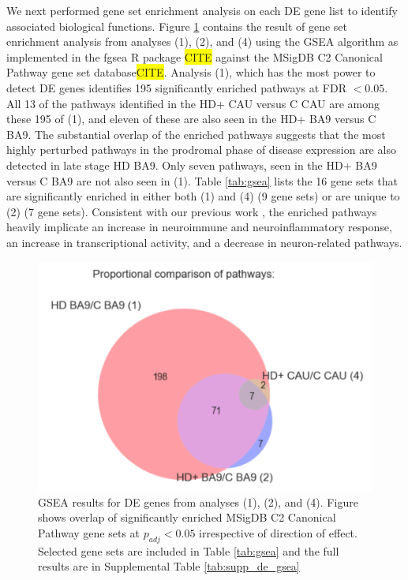 \documentclass[fleqn,10pt,table]{wlscirep}
\newcommand{\todo}[1]{\colorbox{yellow}{#1}}
\begin{document}
We next performed gene set enrichment analysis on each DE gene list to identify associated biological functions.
Figure \ref{fig:gsea} contains the result of gene set enrichment analysis from analyses (1), (2), and (4) using the GSEA \cite{Subramanian2005-tj} algorithm as implemented in the fgsea R package \todo{CITE} against the MSigDB C2 Canonical Pathway gene set database\todo{CITE}.
Analysis (1), which has the most power to detect DE genes identifies 195 significantly enriched pathways at FDR $< 0.05$.
All 13 of the pathways identified in the HD+ CAU versus C CAU are among these 195 of (1), and eleven of these are also seen in the HD+ BA9 versus C BA9.
The substantial overlap of the enriched pathways suggests that the most highly perturbed pathways in the prodromal phase of disease expression are also detected in late stage HD BA9.
Only seven pathways, seen in the HD+ BA9 versus C BA9 are not also seen in (1).
Table \ref{tab:gsea} lists the 16 gene sets that are significantly enriched in either both (1) and (4) (9 gene sets) or are unique to (2) (7 gene sets).
Consistent with our previous work \cite{Labadorf2017-qb}, the enriched pathways heavily implicate an increase in neuroimmune and neuroinflammatory response, an increase in transcriptional activity, and a decrease in neuron-related pathways.

\begin{figure}[ht]
\centering
\includegraphics[width=0.5\linewidth]{Venn_fgsea_pathway.png}
\caption{GSEA results for DE genes from analyses (1), (2), and (4). Figure shows overlap of significantly enriched MSigDB C2 Canonical Pathway gene sets at $p_{adj} < 0.05$ irrespective of direction of effect. Selected gene sets are included in Table \ref{tab:gsea} and the full results are in Supplemental Table \ref{tab:supp_de_gsea} \label{fig:gsea}}
\end{figure}
\end{document}
